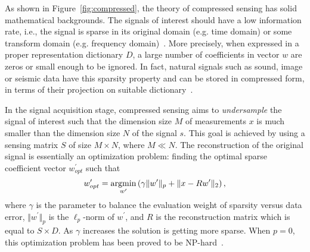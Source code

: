 As shown in Figure~\ref{fig:compressed}, the theory of compressed sensing has solid mathematical backgrounds. 
%
The signals of interest should have a low information rate, i.e., the signal is sparse in its original domain (e.g. time domain) or some transform domain (e.g. frequency domain)~\cite{candes2008introduction}. More precisely, when expressed in a proper representation dictionary $D$, a large number of coefficients in vector $w$ are zeros or small enough to be ignored. In fact, natural signals such as sound, image or seismic data have this sparsity property and can be stored in compressed form, in terms of their projection on suitable dictionary~\cite{qaisar2013compressive}. 


In the signal acquisition stage, compressed sensing aims to \textit{undersample} the signal of interest such that the dimension size $M$ of measurements $x$ is much smaller than the dimension size $N$ of the signal $s$. This goal is achieved by using a sensing matrix $S$ of size $M \times N$, where $M \ll N$.
%
The reconstruction of the original signal is essentially an optimization problem: 
finding the optimal sparse coefficient vector
$w^\prime_{opt}$ such that 
\begin{equation}\label{eq:reconstruction}
w^\prime_{opt}
=
\operatorname*{argmin}_{w^\prime}
\left( 
\gamma
\Vert w^\prime \Vert_p
+
\Vert x - R w^\prime \Vert_2
\right) 
,
\end{equation}
where $\gamma$ is the parameter to balance the evaluation weight of sparsity versus data error, $\Vert w^\prime \Vert_p$ is the $\ell_p$-norm of $w^\prime$, and $R$ is the reconstruction matrix which is equal to $S \times D$. As $\gamma$ increases the solution is getting more sparse. When $p=0$, this optimization problem has been proved to be NP-hard~\cite{natarajan1995sparse}. 







